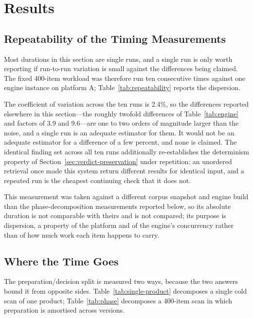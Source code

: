 \documentclass[fleqn,10pt,lineno]{wlpeerj}
\begin{document}
\section{Results}
\label{sec:results}

\subsection{Repeatability of the Timing Measurements}
\label{sec:repeatability}
Most durations in this section are single runs, and a single run is only worth reporting if run-to-run variation is small against the differences being claimed. The fixed 400-item workload was therefore run ten consecutive times against one engine instance on platform A; Table~\ref{tab:repeatability} reports the dispersion.



The coefficient of variation across the ten runs is 2.4\%, so the differences reported elsewhere in this section---the roughly twofold differences of Table~\ref{tab:engine} and factors of 3.9 and 9.6---are one to two orders of magnitude larger than the noise, and a single run is an adequate estimator for them. It would not be an adequate estimator for a difference of a few percent, and none is claimed. The identical finding set across all ten runs additionally re-establishes the determinism property of Section~\ref{sec:verdict-preservation} under repetition: an unordered retrieval once made this system return different results for identical input, and a repeated run is the cheapest continuing check that it does not.

This measurement was taken against a different corpus snapshot and engine build than the phase-decomposition measurements reported below, so its absolute duration is not comparable with theirs and is not compared; its purpose is dispersion, a property of the platform and of the engine's concurrency rather than of how much work each item happens to carry.

\subsection{Where the Time Goes}
The preparation/decision split is measured two ways, because the two answers bound it from opposite sides. Table~\ref{tab:single-product} decomposes a single cold scan of one product; Table~\ref{tab:phase} decomposes a 400-item scan in which preparation is amortised across versions.



\end{document}
